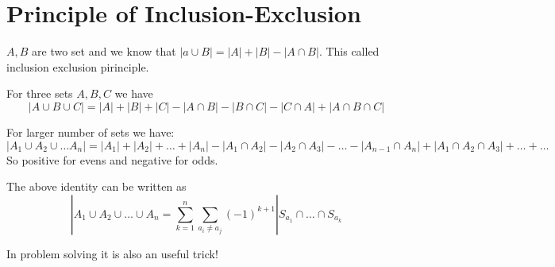 \section{Principle of Inclusion-Exclusion}
$A,B$ are two set and we know that $|a\cup B|=|A|+|B|-|A\cap B|$. This called inclusion exclusion pirinciple.

For three sets $A,B,C$ we have \[|A\cup B \cup C| = |A| + |B| + |C| -|A\cap B| - |B\cap C| - |C\cap  A| + |A\cap B\cap C|\]

For larger number of sets we have: 
\[| A_1 \cup A_2  \cup \ldots A_n |=|A_1| + |A_2| + \ldots +|A_n| -|A_1 \cap A_2| - |A_2 \cap A_3| - \ldots  -|A_{n-1} \cap A_n| + |A_1 \cap A_2 \cap A_3| + \ldots + \ldots  \]
So positive for evens and negative for odds.

The above identity can be written as 
\[|A_1 \cup A_2 \cup \ldots \cup A_n = \sum_{k=1}^n \sum_{a_i \neq a_j} (-1)^{k+1} |S_{a_1}\cap \ldots \cap S_{a_k} \]

In problem solving it is also an useful trick!